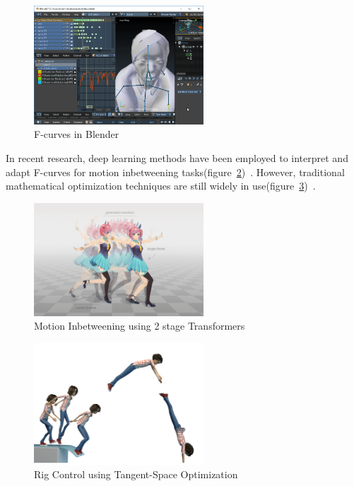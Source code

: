 \documentclass[../../main.tex]{subfiles}
\begin{document}
\begin{figure}
    \centering \includegraphics[width = 2.5in]{chapters/intermediate_blocks/images/fcurves_blender.png}
    \caption{F-curves in Blender}
    \label{fig:fcurves_blender}
\end{figure}

In recent research, deep learning methods have been employed to interpret and adapt F-curves for motion inbetweening tasks(figure~\ref{fig:inbetweening_transformers})~\cite{10.1145/3550454.3555454}. However, traditional mathematical optimization techniques are still widely in use(figure~\ref{fig:inbetweening_disney})~\cite{10.1145/3306346.3322938}.

\begin{figure}
    \centering \includegraphics[width = 2.5in]{chapters/intermediate_blocks/images/inbetweening_transformers.jpg}
    \caption{Motion Inbetweening using 2 stage Transformers~\cite{10.1145/3306346.3322938}}
    \label{fig:inbetweening_transformers}
\end{figure}

\begin{figure}
    \centering \includegraphics[width = 2.5in]{chapters/intermediate_blocks/images/inbetweening_disney.png}
    \caption{Rig Control using Tangent-Space Optimization}
    \label{fig:inbetweening_disney}
\end{figure}
\end{document}
